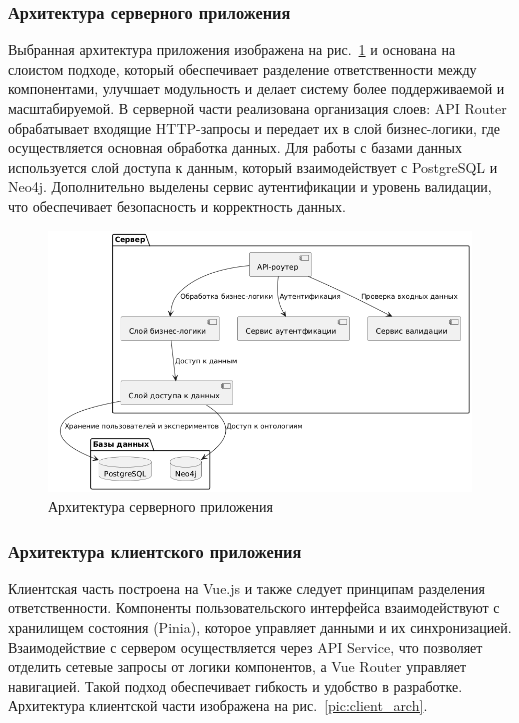 \subsubsection{Архитектура серверного приложения}

Выбранная архитектура приложения изображена на рис.~\ref{pic:server_arch} и основана на слоистом подходе, который обеспечивает разделение ответственности между компонентами, улучшает модульность и делает систему более поддерживаемой и масштабируемой.
В серверной части реализована организация слоев: API Router обрабатывает входящие HTTP-запросы и передает их в слой бизнес-логики, где осуществляется основная обработка данных.
Для работы с базами данных используется слой доступа к данным, который взаимодействует с PostgreSQL и Neo4j.
Дополнительно выделены сервис аутентификации и уровень валидации, что обеспечивает безопасность и корректность данных.

\begin{figure}[H]
    \centering
    \includegraphics[width=0.7\linewidth]{VKR/img/server_arch.png}
    \caption{Архитектура серверного приложения}
    \label{pic:server_arch}
\end{figure}

\subsubsection{Архитектура клиентского приложения}

Клиентская часть построена на Vue.js и также следует принципам разделения ответственности.
Компоненты пользовательского интерфейса взаимодействуют с хранилищем состояния (Pinia\cite{Library:Pinia}), которое управляет данными и их синхронизацией.
Взаимодействие с сервером осуществляется через API Service, что позволяет отделить сетевые запросы от логики компонентов, а Vue Router\cite{Library:VueRouter} управляет навигацией.
Такой подход обеспечивает гибкость и удобство в разработке.
Архитектура клиентской части изображена на рис.~\ref{pic:client_arch}.

